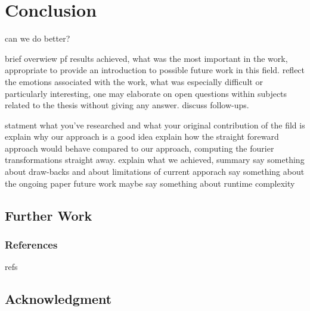 \chapter{Conclusion}

can we do better?

brief overwiew pf results achieved, what was the most important in the work, appropriate to provide an introduction to possible future work in this field. reflect the emotions associated with the work, what was especially difficult or particularly interesting, one may elaborate on open questions within subjects related to the thesis without giving any answer. discuss follow-ups.

statment what you've researched and what your original contribution of the fild is
explain why our approach is a good idea
explain how the straight foreward approach would behave compared to our approach, computing the fourier transformations straight away.
explain what we achieved, summary
say something about draw-backs and about limitations of current apporach
say something about the ongoing paper future work
maybe say something about runtime complexity

\section{Further Work}
\subsection{References}
refs



\section{Acknowledgment}
